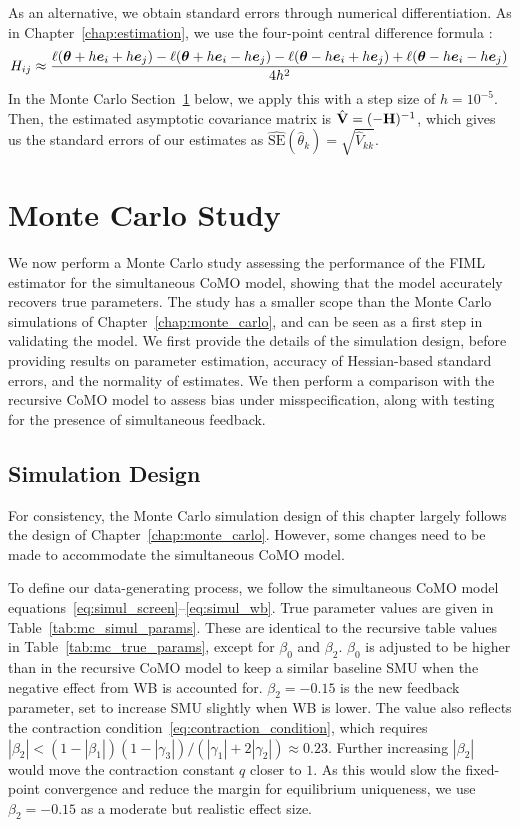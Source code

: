 As an alternative, we obtain standard errors through numerical differentiation. As in Chapter~\ref{chap:estimation}, we use the four-point central difference formula \parencite[Eq.~(1.13), p.~8]{LeVeque2007}:
\begin{equation}
    H_{ij} \approx \frac{\ell(\bm{\theta} + h\bm{e}_i + h\bm{e}_j)
    - \ell(\bm{\theta} + h\bm{e}_i - h\bm{e}_j)
    - \ell(\bm{\theta} - h\bm{e}_i + h\bm{e}_j)
    + \ell(\bm{\theta} - h\bm{e}_i - h\bm{e}_j)}{4h^2}
\end{equation}
In the Monte Carlo Section~\ref{sec:simul:monte_carlo} below, we apply this with a step size of $h = 10^{-5}$. Then, the estimated asymptotic covariance matrix is $\hat{\mathbf{V}} = (-\mathbf{H})^{-1}$, which gives us the standard errors of our estimates as $\widehat{\text{SE}}(\hat\theta_k) = \sqrt{\hat{V}_{kk}}$.

\section{Monte Carlo Study}
\label{sec:simul:monte_carlo}
We now perform a Monte Carlo study assessing the performance of the FIML estimator for the simultaneous CoMO model, showing that the model accurately recovers true parameters. The study has a smaller scope than the Monte Carlo simulations of Chapter~\ref{chap:monte_carlo}, and can be seen as a first step in validating the model. We first provide the details of the simulation design, before providing results on parameter estimation, accuracy of Hessian-based standard errors, and the normality of estimates. We then perform a comparison with the recursive CoMO model to assess bias under misspecification, along with testing for the presence of simultaneous feedback.

\subsection{Simulation Design}
\label{sec:simul:mc_design}
For consistency, the Monte Carlo simulation design of this chapter largely follows the design of Chapter~\ref{chap:monte_carlo}. However, some changes need to be made to accommodate the simultaneous CoMO model.

To define our data-generating process, we follow the simultaneous CoMO model equations~\eqref{eq:simul_screen}--\eqref{eq:simul_wb}. True parameter values are given in Table~\ref{tab:mc_simul_params}. These are identical to the recursive table values in Table~\ref{tab:mc_true_params}, except for $\beta_0$ and $\beta_2$. $\beta_0$ is adjusted to be higher than in the recursive CoMO model to keep a similar baseline SMU when the negative effect from WB is accounted for. $\beta_2 = -0.15$ is the new feedback parameter, set to increase SMU slightly when WB is lower. The value also reflects the contraction condition~\eqref{eq:contraction_condition}, which requires $|\beta_2| < (1 - |\beta_1|)(1 - |\gamma_3|)/(|\gamma_1| + 2|\gamma_2|) \approx 0.23$. Further increasing $|\beta_2|$ would move the contraction constant $q$ closer to $1$. As this would slow the fixed-point convergence and reduce the margin for equilibrium uniqueness, we use $\beta_2 = -0.15$ as a moderate but realistic effect size.

